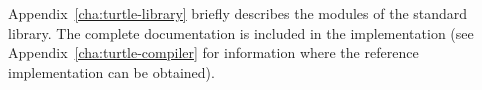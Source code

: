 Appendix~\ref{cha:turtle-library} briefly describes the modules of the
standard library. The complete documentation is included in the
\turtle{} implementation (see Appendix~\ref{cha:turtle-compiler} for
information where the reference implementation can be obtained).








